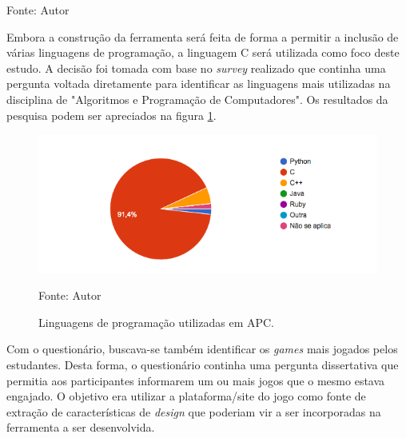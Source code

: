 \begin{table}[h]
	\centering
	\caption{Participação no questionário}
	\label{participantes}
	Fonte: {Autor}
\end{table}

Embora a construção da ferramenta será feita de forma a permitir a inclusão de várias linguagens de programação, a linguagem C será
utilizada como foco deste estudo. A decisão foi tomada com base no \textit{survey} realizado que continha uma pergunta voltada diretamente
para identificar as linguagens mais utilizadas na disciplina de "Algoritmos e Programação de Computadores". Os resultados da pesquisa podem
ser apreciados na figura \ref{linguagemc}.

\begin{figure}[h]
	\centering
	\includegraphics[keepaspectratio=true,scale=0.75]{figuras/linguagemc.png}
	\caption{Linguagens de programação utilizadas em APC.}
	Fonte: {Autor}
	\label{linguagemc}
\end{figure}

Com o questionário, buscava-se também identificar os \textit{games} mais jogados pelos estudantes. Desta forma, o questionário continha uma
pergunta dissertativa que permitia aos participantes informarem um ou mais jogos que o mesmo estava engajado. O objetivo era utilizar 
a plataforma/site do jogo como fonte de extração de características de \textit{design} que poderiam vir a ser incorporadas na ferramenta a ser
desenvolvida.

